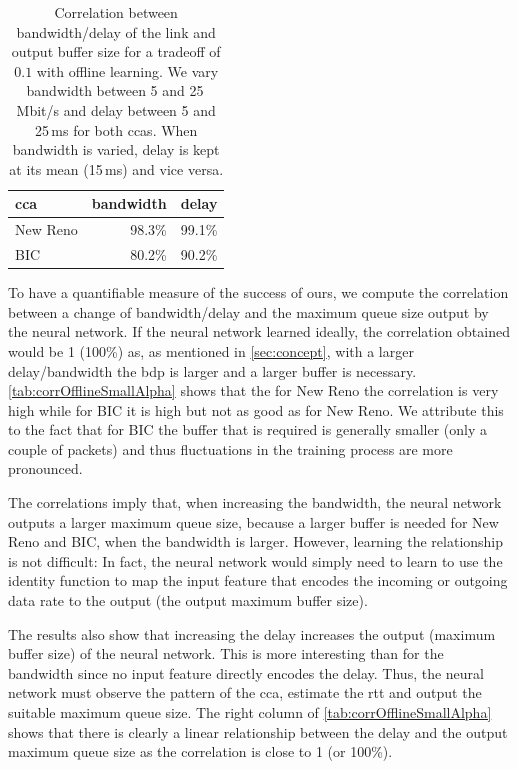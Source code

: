 \documentclass[conference]{IEEEtran}
\begin{document}
\begin{table}[h]
\caption{Correlation between bandwidth/delay of the link and output buffer size for a tradeoff of $0.1$ with offline learning. We vary bandwidth between 5 and 25\,Mbit/s and delay between 5 and 25\,ms for both \glspl{cca}. When bandwidth is varied, delay is kept at its mean (15\,ms) and vice versa.} \label{tab:corrOfflineSmallAlpha}
\centering
\begin{tabular}{lrr} \toprule
\gls{cca} & bandwidth & delay \\ \midrule
New Reno & 98.3\% & 99.1\% \\
BIC & 80.2\% & 90.2\% \\
\bottomrule
\end{tabular}
\end{table}

To have a quantifiable measure of the success of \gls{ours}, we compute the correlation between a change of bandwidth/delay and the maximum queue size output by the neural network. If the neural network learned ideally, the correlation obtained would be 1 (100\%) as, as mentioned in \autoref{sec:concept}, with a larger delay/bandwidth the \gls{bdp} is larger and a larger buffer is necessary. \autoref{tab:corrOfflineSmallAlpha} shows that the for New Reno the correlation is very high while for BIC it is high but not as good as for New Reno. We attribute this to the fact that for BIC the buffer that is required is generally smaller (only a couple of packets) and thus fluctuations in the training process are more pronounced. 

The correlations imply that, when increasing the bandwidth, the neural network outputs a larger maximum queue size, because a larger buffer is needed for New Reno and BIC, when the bandwidth is larger. However, learning the relationship is not difficult: In fact, the neural network would simply need to learn to use the identity function to map the input feature that encodes the incoming or outgoing data rate to the output (the output maximum buffer size). 

The results also show that increasing the delay increases the output (maximum buffer size) of the neural network. This is more interesting than for the bandwidth since no input feature directly encodes the delay. Thus, the neural network must observe the pattern of the \gls{cca}, estimate the \gls{rtt} and output the suitable maximum queue size. The right column of \autoref{tab:corrOfflineSmallAlpha} shows that there is clearly a linear relationship between the delay and the output maximum queue size as the correlation is close to 1 (or 100\%). 
\end{document}
